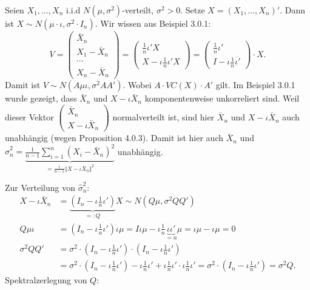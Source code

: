 \documentclass[10pt]{article}
\newcommand{\FZV}{X_1, \ldots, X_n} %
\newcommand{\sni}{\sum_{i=1}^{n}} %
\newenvironment{BSP}[1][]
{\begin{Beispiel}[frametitle=#1]}{\end{Beispiel}}
\begin{document}
			\begin{BSP}[Beispiel 4.0.2 (Mittelwertschätzer)]
				Seien $\FZV$ i.i.d $N(\mu, \sigma^2)$-verteilt, $\sigma^2 >0$. Setze $X=(X_1,\ldots,X_n)'$. Dann ist $X \sim N(\mu \cdot \iota, \sigma^2 \cdot I_n)$. Wir wissen aus Beispiel 3.0.1:
				\begin{equation*}
					V = \left(
					\begin{array}{c}
						\bar{X}_n\\
						X_1 - \bar{X}_n\\
						\cdots\\
						X_n - \bar{X}_n
					\end{array}
					\right) = \left(
					\begin{array}{c}
						\frac{1}{n} \iota' X\\
						X-\iota \frac{1}{n} \iota' X
					\end{array}
					\right) = 
					\left(
					\begin{array}{c}
					    \frac{1}{n} \iota'\\
						I - \iota \frac{1}{n} \iota'
					\end{array}
					\right) \cdot X.
				\end{equation*}
				Damit ist $V \sim N(A\mu \iota, \sigma^2 AA')$. Wobei $A \cdot VC(X) \cdot A'$ gilt. 
				Im Beispiel 3.0.1 wurde gezeigt, dass $\bar{X}_n$ und $X-\iota\bar{X}_n$ komponentenweise unkorreliert sind. Weil dieser Vektor $\left(
				\begin{array}{c}
					\bar{X}_n\\
					X-\iota \bar{X}_n
				\end{array}
				\right)$ normalverteilt ist, sind hier $\bar{X}_n$ und $X-\iota\bar{X}_n$ auch unabhängig (wegen Proposition 4.0.3). Damit ist hier auch $\bar{X}_n$ und $\hat{\sigma}^2_n = \underbrace{\frac{1}{n-1} \sni (X_i - \bar{X}_n)^2}_{= \frac{1}{n-1} \Vert X - \iota \bar{X}_n \Vert ^2}$ unabhängig. 
				
				Zur Verteilung von $\hat{\sigma}^2_n$:
				\begin{equation*}
					\begin{split}
						X - \iota \bar{X}_n &= \underbrace{\left(I_n - \iota \frac{1}{n} \iota'\right)}_{=:Q} X \sim N(Q\mu, \sigma^2 QQ')\\
						Q \mu \iota &= \left( I_n - \iota \frac{1}{n} \iota'\right)\iota\mu = I \iota \mu - \iota \frac{1}{n} \underbrace{\iota \iota'}_{=n}\mu = \iota \mu - \iota \mu =0\\
						\sigma^2 QQ' &= \sigma^2 \cdot \left(I_n - \iota \frac{1}{n}\iota'\right) \cdot \left(I_n - \iota \frac{1}{n}\iota'\right)\\
						&=  \sigma^2 \cdot \left(I_n - \iota \frac{1}{n}\iota'\right) - \iota \frac{1}{n} \iota' + \iota \frac{1}{n} \iota' \cdot \iota \frac{1}{n} \iota' = \sigma^2 \cdot \left(I_n - \iota \frac{1}{n}\iota'\right) = \sigma^2Q.
					\end{split}
				\end{equation*}
				Spektralzerlegung von $Q$:
				

\end{BSP}
\end{document}
